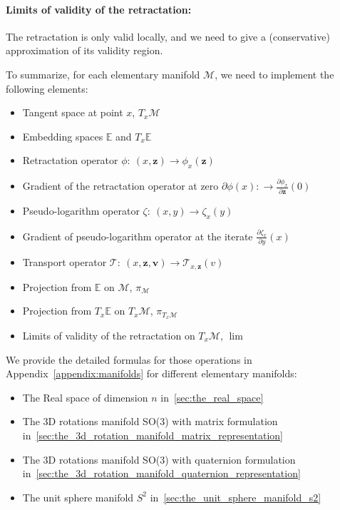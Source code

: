 \paragraph{Limits of validity of the retractation:} The retractation is only valid locally, and we need to give a (conservative) approximation of its validity region.

To summarize, for each elementary manifold $\mathcal{M}$, we need to implement the following elements:
\begin{itemize}
  \item Tangent space at point $x$, $T_x\mathcal{M}$
  \item Embedding spaces $\mathbb{E}$ and $T_x\mathbb{E}$
  \item Retractation operator $\phi:\ (x,\mathbf{z}) \rightarrow \phi_x(\mathbf{z})$
  \item Gradient of the retractation operator at zero $\partial \phi(x):\rightarrow \frac{\partial \phi_x}{\partial \mathbf{z}}(0)$
  \item Pseudo-logarithm operator $\zeta:\ (x,y) \rightarrow \zeta_x(y)$
  \item Gradient of pseudo-logarithm operator at the iterate $\frac{\partial \zeta_x}{\partial y}(x)$
  \item Transport operator $\mathcal{T}:\ (x,\mathbf{z}, \mathbf{v})\rightarrow \mathcal{T}_{x,\mathbf{z}}(v)$
  \item Projection from $\mathbb{E}$ on $\mathcal{M}$, $\pi_\mathcal{M}$
  \item Projection from $T_x\mathbb{E}$ on $T_x\mathcal{M}$, $\pi_{T_x\mathcal{M}}$
  \item Limits of validity of the retractation on $T_x\mathcal{M}$, $\lim$
\end{itemize}

We provide the detailed formulas for those operations in Appendix~\ref{appendix:manifolds} for different elementary manifolds:
\begin{itemize}
  \item The Real space of dimension $n$ in~\ref{sec:the_real_space}
  \item The 3D rotations manifold SO(3) with matrix formulation in~\ref{sec:the_3d_rotation_manifold_matrix_representation}
  \item The 3D rotations manifold SO(3) with quaternion formulation in~\ref{sec:the_3d_rotation_manifold_quaternion_representation}
  \item The unit sphere manifold $S^2$ in~\ref{sec:the_unit_sphere_manifold_s2}
\end{itemize}

